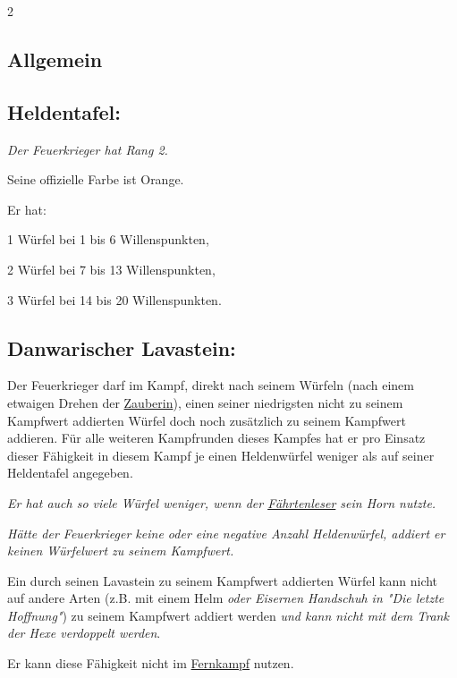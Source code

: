 \documentclass[10pt, a4paper, oneside]{book}
\newcommand{\fan}[1]{\textit{#1}}
\begin{document}
\begin{multicols*}{2}\raggedcolumns

\begin{nobgcolor}

\section{Allgemein}


\subsection{Heldentafel:}

\fan{Der Feuerkrieger hat Rang 2.}

Seine offizielle Farbe ist Orange.

Er hat:

\bullet{} 1 Würfel bei 1 bis 6 Willenspunkten,

\bullet{} 2 Würfel bei 7 bis 13 Willenspunkten,

\bullet{} 3 Würfel bei 14 bis 20 Willenspunkten.





\subsection{Danwarischer Lavastein:}

Der Feuerkrieger darf im Kampf, direkt nach seinem Würfeln (nach einem etwaigen Drehen der \hyperref[Zauberin]{Zauberin}), einen seiner niedrigsten nicht zu seinem Kampfwert addierten Würfel doch noch zusätzlich zu seinem Kampfwert addieren. Für alle weiteren Kampfrunden dieses Kampfes hat er pro Einsatz dieser Fähigkeit in diesem Kampf je einen Heldenwürfel weniger als auf seiner Heldentafel angegeben.

\fan{Er hat auch so viele Würfel weniger, wenn der \hyperref[Fährtenleser]{Fährtenleser} sein Horn nutzte.}

\fan{Hätte der Feuerkrieger keine oder eine negative Anzahl Heldenwürfel, addiert er keinen Würfelwert zu seinem Kampfwert.}

Ein durch seinen Lavastein zu seinem Kampfwert addierten Würfel kann nicht auf andere Arten (z.B. mit einem Helm \fan{oder Eisernen Handschuh in "Die letzte Hoffnung"}) zu seinem Kampfwert addiert werden \fan{und kann nicht mit dem Trank der Hexe verdoppelt werden}.

Er kann diese Fähigkeit nicht im \hyperref[Fernkämpfer]{Fernkampf} nutzen.
\supercite{112103}






\end{nobgcolor}
\end{multicols*}
\end{document}
